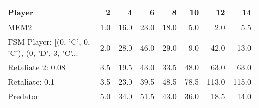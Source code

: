 \begin{tabular}{lrrrrrrr}
\toprule
                                            Player &    2 &     4 &     6 &     8 &    10 &     12 &     14 \\
\midrule
                                              MEM2 &  1.0 &  16.0 &  23.0 &  18.0 &   5.0 &    2.0 &    5.5 \\
 FSM Player: [(0, 'C', 0, 'C'), (0, 'D', 3, 'C'... &  2.0 &  28.0 &  46.0 &  29.0 &   9.0 &   42.0 &   13.0 \\
                                 Retaliate 2: 0.08 &  3.5 &  19.5 &  43.0 &  33.5 &  48.0 &   63.0 &   63.0 \\
                                    Retaliate: 0.1 &  3.5 &  23.0 &  39.5 &  48.5 &  78.5 &  113.0 &  115.0 \\
                                          Predator &  5.0 &  34.0 &  51.5 &  43.0 &  36.0 &   18.5 &   14.0 \\
\bottomrule
\end{tabular}
